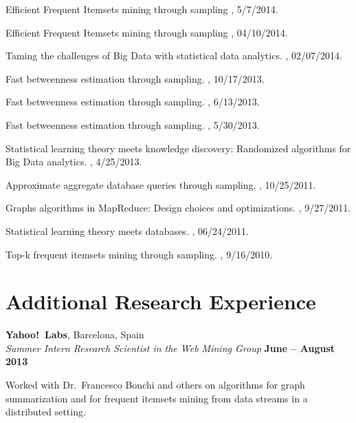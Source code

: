 \documentclass[margin,line]{resume}
\begin{document}
Efficient Frequent Itemsets mining through sampling
, 5/7/2014.

Efficient Frequent Itemsets mining through sampling
,
04/10/2014.

Taming the challenges of Big Data with statistical data analytics.
, 02/07/2014.

Fast betweenness estimation through sampling.
, 10/17/2013.

Fast betweenness estimation through sampling.
, 6/13/2013.

Fast betweenness estimation through sampling.
, 5/30/2013.

Statistical learning theory meets knowledge discovery: Randomized algorithms for
Big Data analytics.
, 4/25/2013.

Approximate aggregate database queries through sampling.
, 10/25/2011.

Graphs algorithms in MapReduce: Design choices and optimizations.
, 9/27/2011.

Statistical learning theory meets databases.
, 06/24/2011.

Top-k frequent itemsets mining through sampling.
, 9/16/2010.

\pagebreak
\section{\sc Additional Research Experience}
{\bf Yahoo!~Labs}, Barcelona, Spain \\
{\em Summer Intern Research Scientist in the Web Mining Group} \hfill {\bf June -- August 2013}

\begin{list2}
\vspace*{.05in}
\item Worked with Dr.~Francesco Bonchi and others on algorithms for graph
  summarization and for frequent itemsets mining from data streams in a
  distributed setting.
\end{list2}
\end{document}
